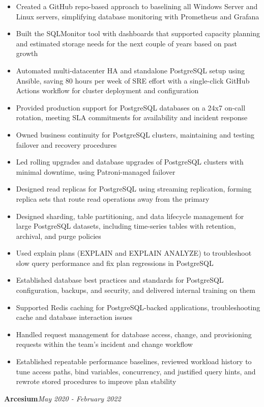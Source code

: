 \documentclass[10pt,a4paper]{article}
\begin{document}
\begin{itemize}
  \item Created a GitHub repo-based approach to baselining all Windows Server and Linux servers, simplifying database monitoring with Prometheus and Grafana
  \item Built the SQLMonitor tool with dashboards that supported capacity planning and estimated storage needs for the next couple of years based on past growth
  \item Automated multi-datacenter HA and standalone PostgreSQL setup using Ansible, saving 80 hours per week of SRE effort with a single-click GitHub Actions workflow for cluster deployment and configuration
  \item Provided production support for PostgreSQL databases on a 24x7 on-call rotation, meeting SLA commitments for availability and incident response
  \item Owned business continuity for PostgreSQL clusters, maintaining and testing failover and recovery procedures
  \item Led rolling upgrades and database upgrades of PostgreSQL clusters with minimal downtime, using Patroni-managed failover
  \item Designed read replicas for PostgreSQL using streaming replication, forming replica sets that route read operations away from the primary
  \item Designed sharding, table partitioning, and data lifecycle management for large PostgreSQL datasets, including time-series tables with retention, archival, and purge policies
  \item Used explain plans (EXPLAIN and EXPLAIN ANALYZE) to troubleshoot slow query performance and fix plan regressions in PostgreSQL
  \item Established database best practices and standards for PostgreSQL configuration, backups, and security, and delivered internal training on them
  \item Supported Redis caching for PostgreSQL-backed applications, troubleshooting cache and database interaction issues
  \item Handled request management for database access, change, and provisioning requests within the team's incident and change workflow
  \item Established repeatable performance baselines, reviewed workload history to tune access paths, bind variables, concurrency, and justified query hints, and rewrote stored procedures to improve plan stability
\end{itemize}
\vspace{14.7pt}
\noindent\textbf{Arcesium}\hfill \textit{May 2020 - February 2022}
\end{document}
